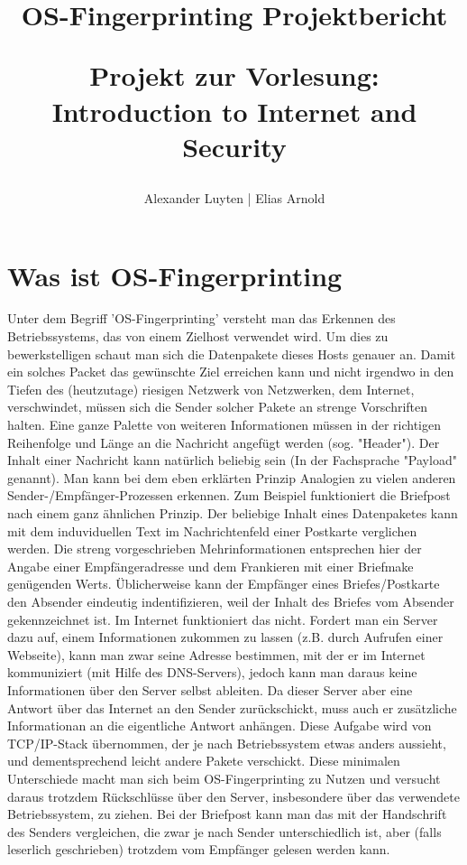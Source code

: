 \documentclass{article} %
\title{OS-Fingerprinting Projektbericht\\
\begin{large}
Projekt zur Vorlesung: Introduction to Internet and Security
\end{large}}
\author{Alexander Luyten | Elias Arnold}
\begin{document}
\maketitle

\tableofcontents

\newpage

\section{Was ist OS-Fingerprinting}
Unter dem Begriff 'OS-Fingerprinting' versteht man das Erkennen des Betriebssystems, das von einem Zielhost verwendet wird. Um dies zu bewerkstelligen schaut man sich die Datenpakete dieses Hosts genauer an. Damit ein solches Packet das gewünschte Ziel erreichen kann und nicht irgendwo in den Tiefen des (heutzutage) riesigen Netzwerk von Netzwerken, dem Internet, verschwindet, müssen sich die Sender solcher Pakete an strenge Vorschriften halten. Eine ganze Palette von weiteren Informationen müssen in der richtigen Reihenfolge und Länge an die Nachricht angefügt werden (sog. "Header"). Der Inhalt einer Nachricht kann natürlich beliebig sein (In der Fachsprache "Payload" genannt). Man kann bei dem eben erklärten Prinzip Analogien zu vielen anderen Sender-/Empfänger-Prozessen erkennen. Zum Beispiel funktioniert die Briefpost nach einem ganz ähnlichen Prinzip. Der beliebige Inhalt eines Datenpaketes kann mit dem induviduellen Text im Nachrichtenfeld einer Postkarte verglichen werden. Die streng vorgeschrieben Mehrinformationen entsprechen hier der Angabe einer Empfängeradresse und dem Frankieren mit einer Briefmake genügenden Werts. Üblicherweise kann der Empfänger eines Briefes/Postkarte den Absender eindeutig indentifizieren, weil der Inhalt des Briefes vom Absender gekennzeichnet ist. Im Internet funktioniert das nicht. Fordert man ein Server dazu auf, einem Informationen zukommen zu lassen (z.B. durch Aufrufen einer Webseite), kann man zwar seine Adresse bestimmen, mit der er im Internet kommuniziert (mit Hilfe des DNS-Servers), jedoch kann man daraus keine Informationen über den Server selbst ableiten. Da dieser Server aber eine Antwort über das Internet an den Sender zurückschickt, muss auch er zusätzliche Informationan an die eigentliche Antwort anhängen. Diese Aufgabe wird von TCP/IP-Stack übernommen, der je nach Betriebssystem etwas anders aussieht, und dementsprechend leicht andere Pakete verschickt. Diese minimalen Unterschiede macht man sich beim OS-Fingerprinting zu Nutzen und versucht daraus trotzdem Rückschlüsse über den Server, insbesondere über das verwendete Betriebssystem, zu ziehen. Bei der Briefpost kann man das mit der Handschrift des Senders vergleichen, die zwar je nach Sender unterschiedlich ist, aber (falls leserlich geschrieben) trotzdem vom Empfänger gelesen werden kann. 
\end{document}
